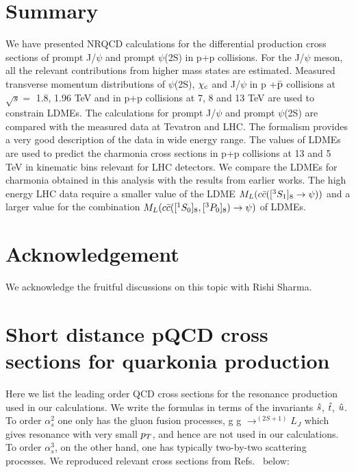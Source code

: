 \documentclass[aps,prc,preprint,superscriptaddress,showpacs,showkeys,amsmath]{revtex4-1}
\begin{document}


\section{Summary}
  We have presented NRQCD calculations for the differential production 
cross sections of prompt J/$\psi$ and prompt $\psi$(2S) in  p+p collisions.
For the J/$\psi$ meson, all the relevant contributions from higher mass states 
are estimated. 
 Measured transverse momentum distributions of $\psi$(2S), $\chi_{\rm c}$ and J/$\psi$ 
in p +{$\bar {\rm p}$} collisions at $\sqrt{s}=$ 1.8, 1.96 TeV and in p+p collisions at 
7, 8 and 13 TeV are used to constrain LDMEs. 
 The calculations for  prompt J/$\psi$ and prompt $\psi$(2S) are compared with the measured 
data at Tevatron and LHC. 
  The formalism provides a very good description of the data in wide energy range. 
The values of LDMEs are used to predict the charmonia cross sections in p+p collisions 
at 13 and 5 TeV in kinematic bins relevant for LHC detectors. 
 We compare the LDMEs for charmonia obtained in this analysis with the results from earlier works.
 The high energy LHC data require a smaller value of the LDME $M_{L}(c{\bar{c}}([^3S_1]_{8}\rightarrow \psi))$ 
and a larger value for the combination  $M_{L}(c{\bar{c}}([^1S_0]_{8},[^3P_0]_{8})\rightarrow \psi)$ of LDMEs.    

\section*{Acknowledgement}
 We acknowledge the fruitful discussions on this topic with Rishi Sharma.

\newpage
\appendix

\section{Short distance pQCD cross sections for quarkonia production}
\label{section:pqcd}
  Here we list the leading order QCD cross sections for the resonance production used 
in our calculations. We write the formulas in terms of the invariants ${\hat{s}}$, ${\hat{t}}$, ${\hat{u}}$.
 To order $\alpha_{s}^{2}$ one only has the gluon fusion processes, 
g g $\rightarrow ^{(2S+1)}L_{J}$ which gives resonance with very small $p_{T}$, 
and hence are not used in our calculations.
To order $\alpha_{s}^{3}$, on the other hand, one has typically two-by-two 
scattering processes. We reproduced relevant cross sections from
Refs.~\cite{Baier:1983va,Humpert:1986cy,Gastmans:1987be,Cho:1995vh,Cho:1995ce,Braaten:2000cm}
below:
\end{document}
